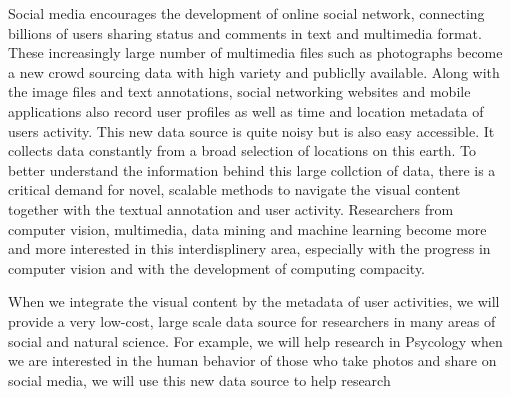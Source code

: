 Social media encourages the development of online social network, connecting billions of users sharing status and comments in text and multimedia format.
These increasingly large number of multimedia files such as photographs become a new crowd sourcing data with high variety and publiclly available.
Along with the image files and text annotations, social networking websites and mobile applications also record user profiles as well as time and location metadata of users activity.
This new data source is quite noisy but is also easy accessible. 
It collects data constantly from a broad selection of locations on this earth. 
To better understand the information behind this large collction of data, there is a critical demand for novel, scalable methods to navigate the visual content together with the textual annotation and user activity.
Researchers from computer vision, multimedia, data mining and machine learning become more and more interested in this interdisplinery area, especially with the progress in computer vision and with the development of computing compacity.

When we integrate the visual content by the metadata of user activities, we will provide a very low-cost, large scale data source for researchers in many areas of social and natural science.
For example, we will help research in Psycology when we are interested in the human behavior of those who take photos and share on social media, we will use this new data source to help research
